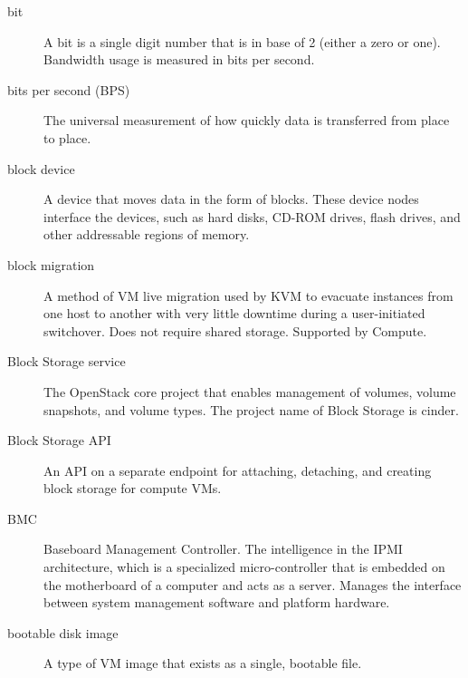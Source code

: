 \documentclass[letterpaper,10pt,english]{sphinxmanual}
\begin{document}
\begin{description}
\item[{bit}] \leavevmode{}\label{_source/glossary:term-bit}
A bit is a single digit number that is in base of 2 (either a
zero or one). Bandwidth usage is measured in bits per second.

\item[{bits per second (BPS)}] \leavevmode{}\label{_source/glossary:term-bits-per-second-bps}
The universal measurement of how quickly data is transferred
from place to place.

\item[{block device}] \leavevmode{}\label{_source/glossary:term-block-device}
A device that moves data in the form of blocks. These device
nodes interface the devices, such as hard disks, CD-ROM drives, flash
drives, and other addressable regions of memory.

\item[{block migration}] \leavevmode{}\label{_source/glossary:term-block-migration}
A method of VM live migration used by KVM to evacuate instances
from one host to another with very little downtime during a
user-initiated switchover. Does not require shared storage. Supported
by Compute.

\item[{Block Storage service}] \leavevmode{}\label{_source/glossary:term-block-storage-service}
The OpenStack core project that enables management of volumes,
volume snapshots, and volume types. The project name of Block Storage
is cinder.

\item[{Block Storage API}] \leavevmode{}\label{_source/glossary:term-block-storage-api}
An API on a separate endpoint for attaching,
detaching, and creating block storage for compute
VMs.

\item[{BMC}] \leavevmode{}\label{_source/glossary:term-bmc}
Baseboard Management Controller. The intelligence in the IPMI
architecture, which is a specialized micro-controller that is embedded
on the motherboard of a computer and acts as a server. Manages the
interface between system management software and platform
hardware.

\item[{bootable disk image}] \leavevmode{}\label{_source/glossary:term-bootable-disk-image}
A type of VM image that exists as a single, bootable
file.


\end{description}
\end{document}
